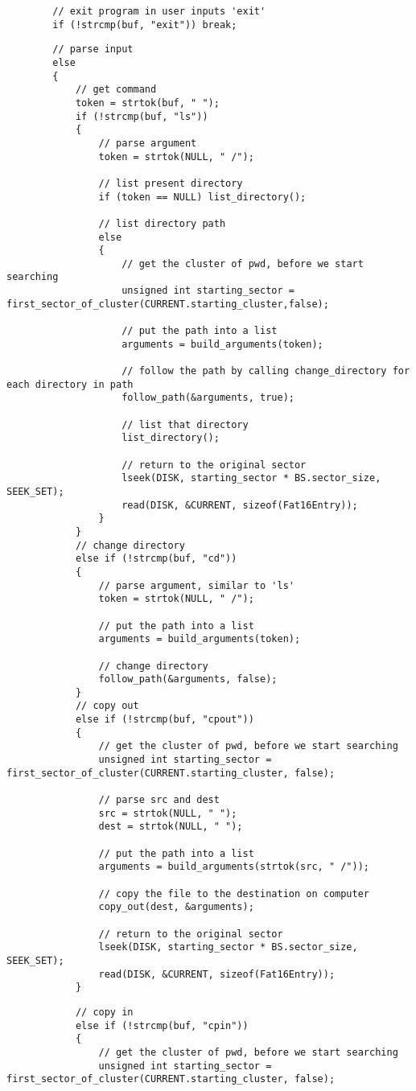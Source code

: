 \documentclass[12pt,letter,titlepage]{article}
\begin{document}
{{\begin{verbatim}
		// exit program in user inputs 'exit'
		if (!strcmp(buf, "exit")) break;
\end{verbatim}
\pagebreak
\begin{verbatim}
		// parse input
		else
		{
			// get command
			token = strtok(buf, " ");
			if (!strcmp(buf, "ls")) 
			{
				// parse argument
				token = strtok(NULL, " /");

				// list present directory
				if (token == NULL) list_directory();

				// list directory path
				else
				{
					// get the cluster of pwd, before we start searching
					unsigned int starting_sector = first_sector_of_cluster(CURRENT.starting_cluster,false);

					// put the path into a list
					arguments = build_arguments(token);

					// follow the path by calling change_directory for each directory in path
					follow_path(&arguments, true);

					// list that directory
					list_directory();

					// return to the original sector
					lseek(DISK, starting_sector * BS.sector_size, SEEK_SET);
					read(DISK, &CURRENT, sizeof(Fat16Entry));
				}
			}
			// change directory
			else if (!strcmp(buf, "cd"))
			{
				// parse argument, similar to 'ls'
				token = strtok(NULL, " /");

				// put the path into a list
				arguments = build_arguments(token);

				// change directory
				follow_path(&arguments, false);	
			}
			// copy out
			else if (!strcmp(buf, "cpout"))
			{
				// get the cluster of pwd, before we start searching
				unsigned int starting_sector = first_sector_of_cluster(CURRENT.starting_cluster, false);

				// parse src and dest
				src = strtok(NULL, " ");
				dest = strtok(NULL, " ");

				// put the path into a list
				arguments = build_arguments(strtok(src, " /"));

				// copy the file to the destination on computer
				copy_out(dest, &arguments);

				// return to the original sector
				lseek(DISK, starting_sector * BS.sector_size, SEEK_SET);
				read(DISK, &CURRENT, sizeof(Fat16Entry));
			}
\end{verbatim}
\pagebreak
\begin{verbatim}
			// copy in
			else if (!strcmp(buf, "cpin"))
			{
				// get the cluster of pwd, before we start searching
				unsigned int starting_sector = first_sector_of_cluster(CURRENT.starting_cluster, false);


\end{verbatim}}}
\end{document}
